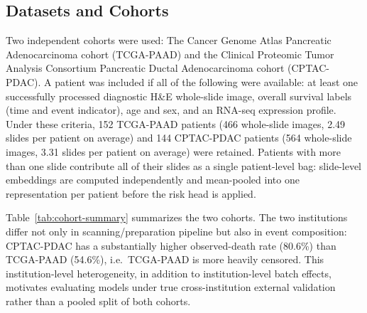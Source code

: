 %

\subsection{Datasets and Cohorts}
\label{subsec:cohorts}

Two independent cohorts were used: The Cancer Genome Atlas Pancreatic
Adenocarcinoma cohort (TCGA-PAAD) and the Clinical Proteomic Tumor Analysis
Consortium Pancreatic Ductal Adenocarcinoma cohort (CPTAC-PDAC). A patient was
included if all of the following were available: at least one successfully
processed diagnostic H\&E whole-slide image, overall survival labels (time and
event indicator), age and sex, and an RNA-seq expression profile. Under these
criteria, 152 TCGA-PAAD patients (466 whole-slide images, 2.49 slides per
patient on average) and 144 CPTAC-PDAC patients (564 whole-slide images, 3.31
slides per patient on average) were retained. Patients with more than one slide
contribute all of their slides as a single patient-level bag: slide-level
embeddings are computed independently and mean-pooled into one representation
per patient before the risk head is applied.

Table~\ref{tab:cohort-summary} summarizes the two cohorts. The two institutions
differ not only in scanning/preparation pipeline but also in event composition:
CPTAC-PDAC has a substantially higher observed-death rate (80.6\%) than
TCGA-PAAD (54.6\%), i.e.\ TCGA-PAAD is more heavily censored. This
institution-level heterogeneity, in addition to institution-level batch effects,
motivates evaluating models under true cross-institution external validation
rather than a pooled split of both cohorts.

